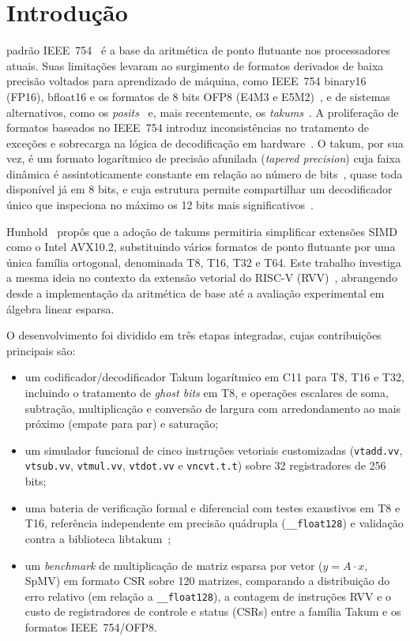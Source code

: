 \documentclass[journal]{IEEEtran}
\begin{document}
\IEEEpeerreviewmaketitle

\section{Introdução}

 padrão IEEE~754~\cite{ieee754} é a base da aritmética de
ponto flutuante nos processadores atuais. Suas limitações levaram ao
surgimento de formatos derivados de baixa precisão voltados para aprendizado
de máquina, como IEEE~754 binary16 (FP16), bfloat16 e os formatos de 8 bits
OFP8 (E4M3 e E5M2)~\cite{hunhold2025avx}, e de sistemas alternativos, como os
\emph{posits}~\cite{gustafson2017} e, mais recentemente, os
\emph{takums}~\cite{hunhold2024beating,hunhold2025avx}. A proliferação de
formatos baseados no IEEE~754 introduz inconsistências no tratamento de
exceções e sobrecarga na lógica de decodificação em hardware~\cite{hunhold2025avx}.
O takum, por sua vez, é um formato logarítmico de precisão afunilada
(\emph{tapered precision}) cuja faixa dinâmica é assintoticamente constante em
relação ao número de bits~\cite{hunhold2024beating}, quase toda disponível já
em 8 bits, e cuja estrutura permite compartilhar um decodificador único que
inspeciona no máximo os 12 bits mais significativos~\cite{hunhold2024codec,hunhold2025avx}.

Hunhold~\cite{hunhold2025avx} propôs que a adoção de takums permitiria
simplificar extensões SIMD como o Intel AVX10.2, substituindo vários
formatos de ponto flutuante por uma única família ortogonal, denominada T8,
T16, T32 e T64. Este trabalho investiga a mesma ideia no contexto da extensão
vetorial do RISC-V (RVV)~\cite{rvv}, abrangendo desde a implementação da
aritmética de base até a avaliação experimental em álgebra linear esparsa.

O desenvolvimento foi dividido em três etapas integradas, cujas contribuições
principais são:
\begin{itemize}
\item um codificador/decodificador Takum logarítmico em C11 para T8, T16 e
T32, incluindo o tratamento de \emph{ghost bits} em T8, e operações escalares
de soma, subtração, multiplicação e conversão de largura com arredondamento
ao mais próximo (empate para par) e saturação;
\item um simulador funcional de cinco instruções vetoriais customizadas
(\texttt{vtadd.vv}, \texttt{vtsub.vv}, \texttt{vtmul.vv}, \texttt{vtdot.vv} e
\texttt{vncvt.t.t}) sobre 32 registradores de 256 bits;
\item uma bateria de verificação formal e diferencial com testes exaustivos em
T8 e T16, referência independente em precisão quádrupla (\texttt{\_\_float128})
e validação contra a biblioteca libtakum~\cite{libtakum};
\item um \emph{benchmark} de multiplicação de matriz esparsa por vetor
($y = A\cdot x$, SpMV) em formato CSR sobre 120 matrizes, comparando a
distribuição do erro relativo (em relação a \texttt{\_\_float128}), a contagem
de instruções RVV e o custo de registradores de controle e status (CSRs) entre
a família Takum e os formatos IEEE~754/OFP8.
\end{itemize}
\end{document}
